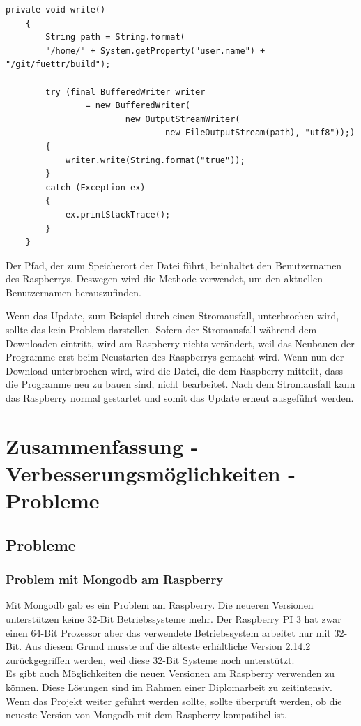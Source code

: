 \begin{lstlisting}[style=JavaStyle, caption= Writer]
    private void write()
    {
        String path = String.format(
        "/home/" + System.getProperty("user.name") + "/git/fuettr/build");

        try (final BufferedWriter writer
                = new BufferedWriter(
                        new OutputStreamWriter(
                                new FileOutputStream(path), "utf8"));)
        {
            writer.write(String.format("true"));
        }
        catch (Exception ex)
        {
            ex.printStackTrace();
        }
    }
\end{lstlisting}
Der Pfad, der zum Speicherort der Datei führt, beinhaltet den Benutzernamen des Raspberrys. Deswegen wird die Methode \textbf{} verwendet, um den aktuellen Benutzernamen herauszufinden.

\vspace{10pt}

Wenn das Update, zum Beispiel durch einen Stromausfall, unterbrochen wird, sollte das kein Problem darstellen. Sofern der Stromausfall während dem Downloaden eintritt, wird am Raspberry nichts verändert, weil das Neubauen der Programme erst beim Neustarten des Raspberrys gemacht wird. Wenn nun der Download unterbrochen wird, wird die Datei, die dem Raspberry mitteilt, dass die Programme neu zu bauen sind, nicht bearbeitet. Nach dem Stromausfall kann das Raspberry normal gestartet und somit das Update erneut ausgeführt werden.

\newpage

\section{Zusammenfassung - Verbesserungsmöglichkeiten - Probleme}

\subsection{Probleme}
\subsubsection{Problem mit Mongodb am Raspberry}
Mit Mongodb gab es ein Problem am Raspberry. Die neueren Versionen unterstützen keine 32-Bit Betriebssysteme mehr. Der Raspberry PI 3 hat zwar einen 64-Bit Prozessor aber das verwendete Betriebssystem arbeitet nur mit 32-Bit. Aus diesem Grund musste auf die älteste erhältliche Version 2.14.2 zurückgegriffen werden, weil diese 32-Bit Systeme noch unterstützt.
\\ Es gibt auch Möglichkeiten die neuen Versionen am Raspberry verwenden zu können. Diese Lösungen sind im Rahmen einer Diplomarbeit zu zeitintensiv.
\\ Wenn das Projekt weiter geführt werden sollte, sollte überprüft werden, ob die neueste Version von Mongodb mit dem Raspberry kompatibel ist.
